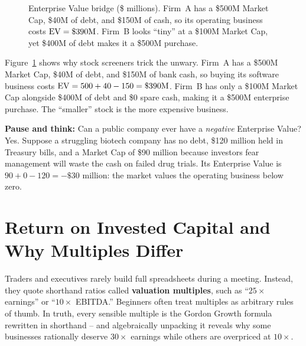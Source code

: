 \begin{figure}[htbp]
\caption{Enterprise Value bridge (\$ millions). Firm~A has a \$500M Market Cap, \$40M of debt, and \$150M of cash, so its operating business costs $\operatorname{EV} = \$390\text{M}$. Firm~B looks ``tiny'' at a \$100M Market Cap, yet \$400M of debt makes it a \$500M purchase.}
\label{fig:ch03-ev-bridge}
\end{figure}

Figure~\ref{fig:ch03-ev-bridge} shows why stock screeners trick the unwary. Firm~A has a \$500M Market Cap, \$40M of debt, and \$150M of bank cash, so buying its software business costs $\operatorname{EV} = 500 + 40 - 150 = \$390\text{M}$. Firm~B has only a \$100M Market Cap alongside \$400M of debt and \$0 spare cash, making it a \$500M enterprise purchase. The ``smaller'' stock is the more expensive business.

\begin{recoverybox}
\textbf{Pause and think:} Can a public company ever have a \emph{negative} Enterprise Value? Yes. Suppose a struggling biotech company has no debt, \$120 million held in Treasury bills, and a Market Cap of \$90 million because investors fear management will waste the cash on failed drug trials. Its Enterprise Value is $90 + 0 - 120 = -\$30$ million: the market values the operating business below zero.
\end{recoverybox}

\section{Return on Invested Capital and Why Multiples Differ}

Traders and executives rarely build full spreadsheets during a meeting. Instead, they quote shorthand ratios called \textbf{valuation multiples}, such as ``$25\times$ earnings'' or ``$10\times$ EBITDA.'' Beginners often treat multiples as arbitrary rules of thumb. In truth, every sensible multiple is the Gordon Growth formula rewritten in shorthand -- and algebraically unpacking it reveals why some businesses rationally deserve $30\times$ earnings while others are overpriced at $10\times$.

